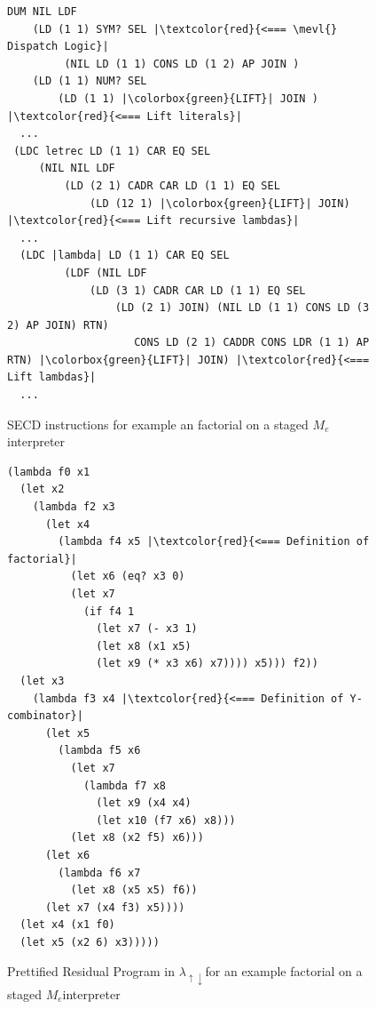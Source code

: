 \documentclass[a4paper,12pt,twoside,openright]{report}
\theoremstyle{definition}
\newcommand{\mslang}{$\lambda_{\uparrow\downarrow}$}
\newcommand{\mevl}{$M_{e}$}
\begin{document}
\begin{figure}[htp!]
\centering
         \begin{verbatim}
DUM NIL LDF
    (LD (1 1) SYM? SEL |\textcolor{red}{<=== \mevl{} Dispatch Logic}|
         (NIL LD (1 1) CONS LD (1 2) AP JOIN )
    (LD (1 1) NUM? SEL
        (LD (1 1) |\colorbox{green}{LIFT}| JOIN ) |\textcolor{red}{<=== Lift literals}|
  ...
 (LDC letrec LD (1 1) CAR EQ SEL
     (NIL NIL LDF
         (LD (2 1) CADR CAR LD (1 1) EQ SEL
             (LD (12 1) |\colorbox{green}{LIFT}| JOIN) |\textcolor{red}{<=== Lift recursive lambdas}|
  ...
  (LDC |lambda| LD (1 1) CAR EQ SEL
         (LDF (NIL LDF
             (LD (3 1) CADR CAR LD (1 1) EQ SEL
                 (LD (2 1) JOIN) (NIL LD (1 1) CONS LD (3 2) AP JOIN) RTN)
                    CONS LD (2 1) CADDR CONS LDR (1 1) AP RTN) |\colorbox{green}{LIFT}| JOIN) |\textcolor{red}{<=== Lift lambdas}|
  ...
         \end{verbatim}
\caption{SECD instructions for example an factorial on a staged \mevl interpreter}
\label{lst:mevl_staged_secd_ops}
\end{figure}

\begin{figure}[htp!]
\centering
     \begin{verbatim}
(lambda f0 x1
  (let x2
    (lambda f2 x3
      (let x4
        (lambda f4 x5 |\textcolor{red}{<=== Definition of factorial}|
          (let x6 (eq? x3 0)
          (let x7
            (if f4 1
              (let x7 (- x3 1)
              (let x8 (x1 x5)
              (let x9 (* x3 x6) x7)))) x5))) f2))
  (let x3
    (lambda f3 x4 |\textcolor{red}{<=== Definition of Y-combinator}|
      (let x5
        (lambda f5 x6
          (let x7
            (lambda f7 x8
              (let x9 (x4 x4)
              (let x10 (f7 x6) x8)))
          (let x8 (x2 f5) x6)))
      (let x6
        (lambda f6 x7
          (let x8 (x5 x5) f6))
      (let x7 (x4 f3) x5))))
  (let x4 (x1 f0)
  (let x5 (x2 6) x3)))))
         \end{verbatim}
         \caption{Prettified Residual Program in \mslang for an example factorial on a staged \mevl interpreter}
         \label{lst:mevl_staged_secd_ped}
\end{figure}
\pagebreak

\end{document}
